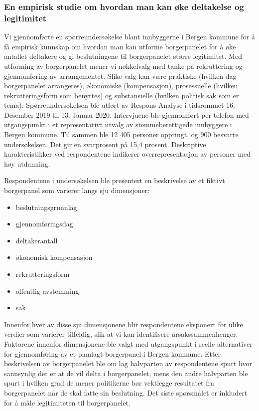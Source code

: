 \documentclass[
  12pt,
  a4paper, 12pt]{article}
\providecommand{\tightlist}{%
  \setlength{\itemsep}{0pt}\setlength{\parskip}{0pt}}
\begin{document}
\hypertarget{en-empirisk-studie-om-hvordan-man-kan-uxf8ke-deltakelse-og-legitimitet}{%
\subsubsection{En empirisk studie om hvordan man kan øke deltakelse og legitimitet}\label{en-empirisk-studie-om-hvordan-man-kan-uxf8ke-deltakelse-og-legitimitet}}

Vi gjennomførte en spørreundersøkelse blant innbyggerne i Bergen kommune for å få empirisk kunnskap om hvordan man kan utforme borgerpanelet for å øke antallet deltakere og gi beslutningene til borgerpanelet større legitimitet. Med utforming av borgerpanelet mener vi nøkkelvalg med tanke på rekruttering og gjennomføring av arrangementet. Slike valg kan være praktiske (hvilken dag borgerpanelet arrangeres), økonomiske (kompensasjon), prosessuelle (hvilken rekrutteringsform som benyttes) og substansielle (hvilken politisk sak som er tema).
Spørreundersøkelsen ble utført av Respons Analyse i tidsrommet 16. Desember 2019 til 13. Januar 2020. Intervjuene ble gjennomført per telefon med utgangspunkt i et representativt utvalg av stemmeberettigede innbyggere i Bergen kommune. Til sammen ble 12 405 personer oppringt, og 900 besvarte undersøkelsen. Det gir en svarprosent på 15,4 prosent. Deskriptive karakteristikker ved respondentene indikerer overrepresentasjon av personer med høy utdanning.

Respondentene i undersøkelsen ble presentert en beskrivelse av et fiktivt borgerpanel som varierer langs sju dimensjoner:

\begin{itemize}
\tightlist
\item
  beslutningsgrunnlag\\
\item
  gjennomføringsdag\\
\item
  deltakerantall\\
\item
  økonomisk kompensasjon\\
\item
  rekrutteringsform\\
\item
  offentlig avstemming\\
\item
  sak
\end{itemize}

Innenfor hver av disse sju dimensjonene blir respondentene eksponert for ulike verdier som varierer tilfeldig, slik at vi kan identifisere årsakssammenhenger. Faktorene innenfor dimensjonene ble valgt med utgangspunkt i reelle alternativer for gjennomføring av et planlagt borgerpanel i Bergen kommune. Etter beskrivelsen av borgerpanelet ble om lag halvparten av respondentene spurt hvor sannsynlig det er at de vil delta i borgerpanelet, mens den andre halvparten ble spurt i hvilken grad de mener politikerne bør vektlegge resultatet fra borgerpanelet når de skal fatte sin beslutning. Det siste spørsmålet er inkludert for å måle legitimiteten til borgerpanelet.
\end{document}
